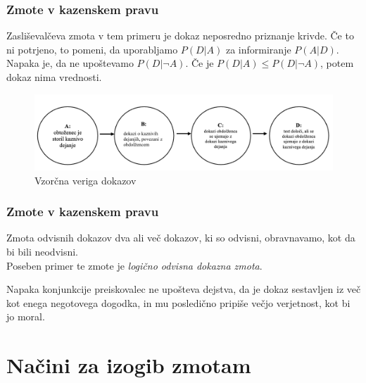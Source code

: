 \documentclass{beamer}
\begin{document}
\begin{frame}
    \frametitle{Zmote v kazenskem pravu}
    \begin{block}{Zasliševalčeva zmota}
        v tem primeru je dokaz neposredno priznanje krivde. Če to ni potrjeno, to pomeni, da uporabljamo $P(D \lvert A)$ za
        informiranje $P(A \lvert D)$. Napaka je, da ne upoštevamo $P(D \lvert \neg A)$. Če je $P(D \lvert A) \leq P(D \lvert \neg A)$, potem dokaz
        nima vrednosti.    
    \end{block}
    \begin{figure}[!ht]\label{fig:slika_3}
        \centering
        \includegraphics[scale=0.40]{slika_3.png}
        \caption{Vzorčna veriga dokazov}
    \end{figure}
\end{frame}

\begin{frame}
    \frametitle{Zmote v kazenskem pravu}
    \begin{block}{Zmota odvisnih dokazov}
        dva ali več dokazov, ki so odvisni, obravnavamo, kot da bi bili neodvisni. \\
        Poseben primer te zmote je \textit{logično odvisna dokazna zmota}.\\ 
    \end{block} \vspace{2mm}
    \begin{block}{Napaka konjunkcije}
        preiskovalec ne upošteva dejstva, da je dokaz sestavljen iz več kot enega negotovega dogodka, in mu posledično pripiše večjo verjetnost, kot bi jo moral.
    \end{block}
\end{frame}

\section{Načini za izogib zmotam}
\end{document}
